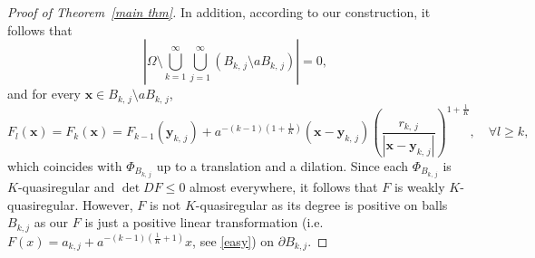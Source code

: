 \documentclass[10pt,a4paper]{amsart}
\begin{document}
\begin{proof}[Proof of Theorem~\ref{main thm}]
In addition, according to our construction, it follows that
\begin{equation}\label{zero null set}
    \left|\Omega\setminus \bigcup_{k=1}^\infty\bigcup_{j=1}^\infty (B_{k,\,j}\setminus aB_{k,\,j})\right|=0,
\end{equation} 
and for every $\mathbf x\in B_{k,\,j}\setminus aB_{k,\,j}$,
\begin{equation}\label{easy}
F_{l}(\mathbf x) = F_k(\mathbf x)= F_{k-1}(\mathbf{y}_{k,\,j})+  a^{-(k-1) (1+\frac 1 K)}(\mathbf x-\mathbf y_{k,\,j})\left(\frac{r_{k,\,j}}{|\mathbf x-\mathbf y_{k,\,j}|}\right)^{1+\frac 1 K}, \quad \forall l\ge k,
\end{equation}
which coincides with $\Phi_{B_{k,\,j}}$ up to a translation and a dilation. 
Since each $\Phi_{B_{k,\,j}}$ is $K$-quasiregular and $\det DF\le 0$ almost everywhere, it follows that $F$ is weakly $K$-quasiregular.  However, $F$ is not $K$-quasiregular as its degree is positive on balls $B_{k,j}$ as our $F$ is just a positive linear transformation (i.e. $F(x)=a_{k,j}+a^{-(k-1)(\frac{1}{K}+1)} x$, see \eqref{easy}) on $\partial B_{k,j}$. 

\medskip


\end{proof}
\end{document}
